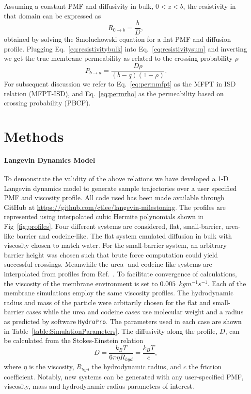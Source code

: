         Assuming a constant PMF and diffusivity in bulk, $0<z<b$, the resistivity in that domain can be expressed as
        \begin{equation}
            R_{0\rightarrow b} = \frac{b}{D},
            \label{eq:resistivitybulk}
        \end{equation}
        obtained by solving the Smoluchowski equation for a flat PMF and diffusion profile. Plugging Eq.~\ref{eq:resistivitybulk} into Eq.~\ref{eq:resistivitysum} and inverting we get the true membrane permeability as related to the crossing probability $\rho$
        \begin{equation}
            P_{b\rightarrow a} = \frac{D\rho}{(b-q)(1-\rho)}.
            \label{eq:permrho}
        \end{equation}
        For subsequent discussion we refer to Eq.~\ref{eq:permmfpt} as the MFPT in ISD relation (MFPT-ISD), and Eq.~\ref{eq:permrho} as the permeability based on crossing probability (PBCP).


\section{Methods}
    \paragraph{Langevin Dynamics Model} To demonstrate the validity of the above relations we have developed a 1-D Langevin dynamics model to generate sample trajectories over a user specified PMF and viscosity profile. All code used has been made available through GitHub at \url{https://github.com/ctlee/langevin-milestoning}. The profiles are represented using interpolated cubic Hermite polynomials shown in Fig~\ref{fig:profiles}. Four different systems are considered, flat, small-barrier, urea-like barrier and codeine-like. The flat system emulated diffusion in bulk with viscosity chosen to match water. For the small-barrier system, an arbitrary barrier height was chosen such that brute force computation could yield successful crossings. Meanwhile the urea- and codeine-like systems are interpolated from profiles from Ref.~. To facilitate convergence of calculations, the viscosity of the membrane environment is set to $0.005$~$kg m^{-1}s^{-1}$. Each of the membrane simulations employ the same viscosity profiles. The hydrodynamic radius and mass of the particle were arbitarily chosen for the flat and small-barrier cases while the urea and codeine cases use molecular weight and a radius as predicted by software \texttt{HydroPro}\cite{Ortega2011}. The parameters used in each case are shown in Table~\ref{table:SimulationParameters}. The diffusivity along the profile, $D$, can be calculated from the Stokes-Einstein relation
    \begin{equation}
        D = \frac{k_BT}{6\pi\eta R_{hyd}} = \frac{k_BT}{c},
        \label{eq:stokes-einstein}
    \end{equation}
    where $\eta$ is the viscosity, $R_{hyd}$ the hydrodynamic radius, and $c$ the friction coefficient. Notably, new systems can be generated with any user-specified PMF, viscosity, mass and hydrodynamic radius parameters of interest.

